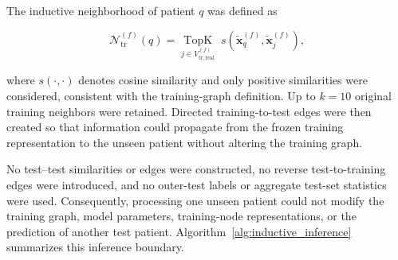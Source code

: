 \documentclass[pdflatex,sn-mathphys-num]{sn-jnl}%
\theoremstyle{thmstyleone}%
\theoremstyle{thmstyletwo}%
\theoremstyle{thmstylethree}%
\begin{document}
 {
The inductive neighborhood of patient \(q\) was defined as
}

{ 
\begin{equation}
\mathcal{N}_{\mathrm{tr}}^{(f)}(q)
=
\underset{
j\in V_{\mathrm{tr,real}}^{(f)}
}{
\operatorname{TopK}
}
\;
s\left(
\widetilde{\mathbf{x}}_{q}^{(f)},
\widetilde{\mathbf{x}}_{j}^{(f)}
\right),
\label{eq:inductive_test_neighborhood}
\end{equation}
}

 {
where \(s(\cdot,\cdot)\) denotes cosine similarity and only positive
similarities were considered, consistent with the training-graph definition.
Up to \(k=10\) original training neighbors were retained. Directed
training-to-test edges were then created so that information could propagate
from the frozen training representation to the unseen patient without
altering the training graph.
}

 {
No test--test similarities or edges were constructed, no reverse
test-to-training edges were introduced, and no outer-test labels or aggregate
test-set statistics were used. Consequently, processing one unseen patient
could not modify the training graph, model parameters, training-node
representations, or the prediction of another test patient.
Algorithm~\ref{alg:inductive_inference} summarizes this inference boundary.
}

\begingroup
 
\end{document}
